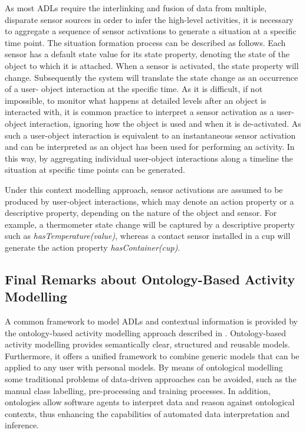 As most ADLs require the interlinking and fusion of data from multiple, disparate sensor sources in order to infer the high-level activities, it is necessary to aggregate a sequence of sensor activations to generate a situation at a specific time point. The situation formation process can be described as follows. Each sensor has a default state value for its state property, denoting the state of the object to which it is attached. When a sensor is activated, the state property will change. Subsequently the system will translate the state change as an occurrence of a user- object interaction at the specific time. As it is difficult, if not impossible, to monitor what happens at detailed levels after an object is interacted with, it is common practice to interpret a sensor activation as a user-object interaction, ignoring how the object is used and when it is de-activated. As such a user-object interaction is equivalent to an instantaneous sensor activation and can be interpreted as an object has been used for performing an activity. In this way, by aggregating individual user-object interactions along a timeline the situation at specific time points can be generated. 

Under this context modelling approach, sensor activations are assumed to be produced by user-object interactions, which may denote an action property or a descriptive property, depending on the nature of the object and sensor. For example, a thermometer state change will be captured by a descriptive property such as \textit{hasTemperature(value)}, whereas a contact sensor installed in a cup will generate the action property \textit{hasContainer(cup)}. 

\subsection{Final Remarks about Ontology-Based Activity Modelling}

A common framework to model ADLs and contextual information is provided by the ontology-based activity modelling approach described in \cite{Chen2012a}. Ontology-based activity modelling provides semantically clear, structured and reusable models. Furthermore, it offers a unified framework to combine generic models that can be applied to any user with personal models. By means of ontological modelling some traditional problems of data-driven approaches can be avoided, such as the manual class labelling, pre-processing and training processes. In addition, ontologies allow software agents to interpret data and reason against ontological contexts, thus enhancing the capabilities of automated data interpretation and inference.

